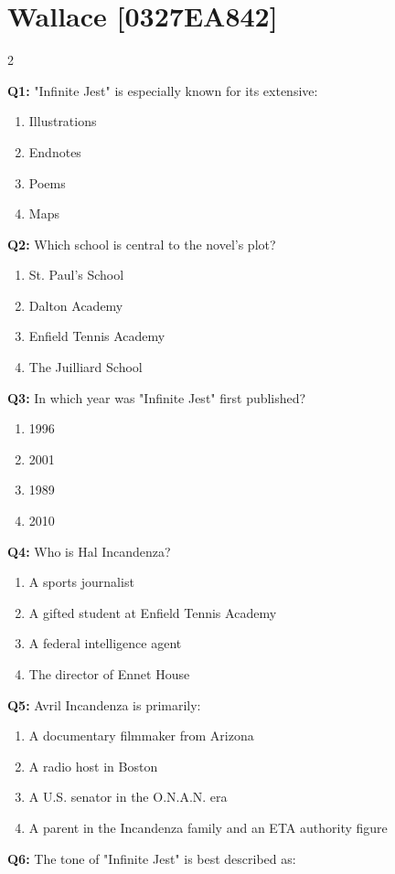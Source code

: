 \documentclass[10pt]{article}
\begin{document}
\section*{Wallace \footnotesize [0327EA842]}
\begin{multicols}{2}

\textbf{Q1:} "Infinite Jest" is especially known for its extensive:

\begin{enumerate}[label=\arabic*.]
\item Illustrations
\item Endnotes
\item Poems
\item Maps
\end{enumerate}
\textbf{Q2:} Which school is central to the novel's plot?

\begin{enumerate}[label=\arabic*.]
\item St. Paul's School
\item Dalton Academy
\item Enfield Tennis Academy
\item The Juilliard School
\end{enumerate}
\textbf{Q3:} In which year was "Infinite Jest" first published?

\begin{enumerate}[label=\arabic*.]
\item 1996
\item 2001
\item 1989
\item 2010
\end{enumerate}
\textbf{Q4:} Who is Hal Incandenza?

\begin{enumerate}[label=\arabic*.]
\item A sports journalist
\item A gifted student at Enfield Tennis Academy
\item A federal intelligence agent
\item The director of Ennet House
\end{enumerate}
\textbf{Q5:} Avril Incandenza is primarily:

\begin{enumerate}[label=\arabic*.]
\item A documentary filmmaker from Arizona
\item A radio host in Boston
\item A U.S. senator in the O.N.A.N. era
\item A parent in the Incandenza family and an ETA authority figure
\end{enumerate}
\textbf{Q6:} The tone of "Infinite Jest" is best described as:


\end{multicols}
\end{document}
